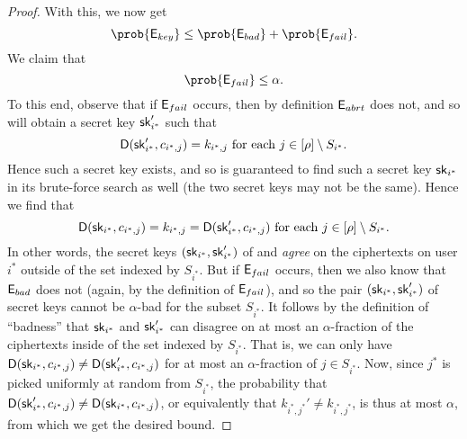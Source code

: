\begin{proof}
  With this, we now get
  \[
    \prob{\eventE_{key}} \le \prob{\eventE_{bad}} + \prob{\eventE_{fail}}.
  \]
  We claim that
  \[
    \prob{\eventE_{fail}} \le \alpha.
  \]
  To this end, observe that if \(\mathsf{E}_{fail}\) occurs,
  then by definition \(\mathsf{E}_{abrt}\) does not, and so
  \redM will obtain a secret key \(\mathsf{sk}_{i^{*}}'\) such that
  \[
    \mathsf{D}(\mathsf{sk}_{i^{*}}',c_{i^{*},j}) = k_{i^{*},j} \text{ for each } j \in [\rho] \setminus S_{i^{*}}.
  \]
  Hence such a secret key exists, and so \advA is guaranteed to find such a secret key \(\mathsf{sk}_{i^{*}}\)
  in its brute-force search as well (the two secret keys may not be the same).
  Hence we find that
  \[
    \mathsf{D}(\mathsf{sk}_{i^{*}},c_{i^{*},j}) = k_{i^{*},j} = \mathsf{D}(\mathsf{sk}_{i^{*}}',c_{i^{*},j}) \text{ for each } j \in [\rho] \setminus S_{i^{*}}.
  \]
  In other words, the secret keys \((\mathsf{sk}_{i^{*}},\mathsf{sk}_{i^{*}}')\)
  of \advA and \redM \emph{agree} on the ciphertexts on user \(i^{*}\) outside of the set indexed by \(S_{i^{*}}\).
  But if \(\mathsf{E}_{fail}\) occurs, then we also know that \(\mathsf{E}_{bad}\) does not
  (again, by the definition of \(\mathsf{E}_{fail}\)),
  and so the pair \((\mathsf{sk}_{i^{*}},\mathsf{sk}_{i^{*}}')\) of secret keys cannot be
  \(\alpha\)-bad for the subset \(S_{i^{*}}\).
  It follows by the definition of ``badness'' that \(\mathsf{sk}_{i^{*}}\) and \(\mathsf{sk}_{i^{*}}'\)
  can disagree on at most an \(\alpha\)-fraction of the ciphertexts inside of the set indexed by \(S_{i^{*}}\).
  That is, we can only have
  \(\mathsf{D}(\mathsf{sk}_{i^{*}},c_{i^{*},j}) \ne \mathsf{D}(\mathsf{sk}_{i^{*}}',c_{i^{*},j})\)
  for at most an \(\alpha\)-fraction of \(j \in S_{i^{*}}\).
  Now, since \(j^{*}\) is picked uniformly at random from \(S_{i^{*}}\),
  the probability that
  \(\mathsf{D}(\mathsf{sk}_{i^{*}}',c_{i^{*},j}) \ne \mathsf{D}(\mathsf{sk}_{i^{*}},c_{i^{*},j})\),
  or equivalently that \(k_{i^{*},j^{*}}' \ne k_{i^{*},j^{*}}\),
  is thus at most \(\alpha\),
  from which we get the desired bound.


\end{proof}
